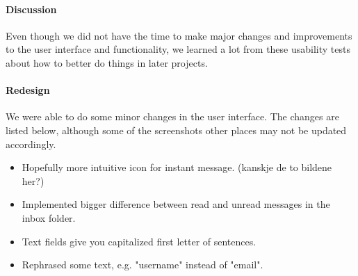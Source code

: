 		\paragraph{Discussion}
Even though we did not have the time to make major changes and improvements to the user interface and functionality, we learned a lot from these usability tests about how to better do things in later projects.
		\paragraph{Redesign}
		We were able to do some minor changes in the user interface. The changes are listed below, although some of the screenshots other places may not be updated accordingly.
		\begin{itemize}
			\item{}Hopefully more intuitive icon for instant message. (kanskje de to bildene her?)
			\item{}Implemented bigger difference between read and unread messages in the inbox folder.
			\item{}Text fields give you capitalized first letter of sentences.
			\item{}Rephrased some text, e.g. "username" instead of "email".
		\end{itemize}